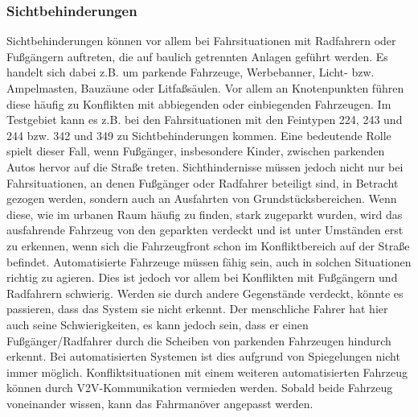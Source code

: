 \subsubsection{Sichtbehinderungen}
Sichtbehinderungen können vor allem bei Fahrsituationen mit Radfahrern oder Fußgängern auftreten, die auf baulich getrennten Anlagen geführt werden. Es handelt sich dabei z.B. um parkende Fahrzeuge, Werbebanner, Licht- bzw. Ampelmasten, Bauzäune oder Litfaßsäulen. Vor allem an Knotenpunkten führen diese häufig zu Konflikten mit abbiegenden oder einbiegenden Fahrzeugen. Im Testgebiet kann es z.B. bei den Fahrsituationen mit den Feintypen 224, 243 und 244 bzw. 342 und 349 zu Sichtbehinderungen kommen. Eine bedeutende Rolle spielt dieser Fall, wenn Fußgänger, insbesondere Kinder, zwischen parkenden Autos hervor auf die Straße treten. Sichthindernisse müssen jedoch nicht nur bei Fahrsituationen, an denen Fußgänger oder Radfahrer beteiligt sind, in Betracht gezogen werden, sondern auch an Ausfahrten von Grundstücksbereichen. Wenn diese, wie im urbanen Raum häufig zu finden, stark zugeparkt wurden, wird das ausfahrende Fahrzeug von den geparkten verdeckt und ist unter Umständen erst zu erkennen, wenn sich die Fahrzeugfront schon im Konfliktbereich auf der Straße befindet. Automatisierte Fahrzeuge müssen fähig sein, auch in solchen Situationen richtig zu agieren. Dies ist jedoch vor allem bei Konflikten mit Fußgängern und Radfahrern schwierig. Werden sie durch andere Gegenstände verdeckt, könnte es passieren, dass das System sie nicht erkennt. Der menschliche Fahrer hat hier auch seine Schwierigkeiten, es kann jedoch sein, dass er einen Fußgänger/Radfahrer durch die Scheiben von parkenden Fahrzeugen hindurch erkennt. Bei automatisierten Systemen ist dies aufgrund von Spiegelungen nicht immer möglich. Konfliktsituationen mit einem weiteren automatisierten Fahrzeug können durch \ac{V2V}-Kommunikation vermieden werden. Sobald beide Fahrzeug voneinander wissen, kann das Fahrmanöver angepasst werden.

